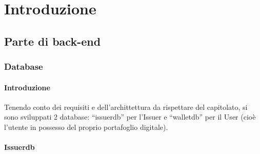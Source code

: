 \section{Introduzione}

\subsection{Parte di back-end}

\subsubsection{Database}\label{Database}

\paragraph{Introduzione}
Tenendo conto dei requisiti e dell’archittettura da rispettare del capitolato, si sono sviluppati 2 database: “issuerdb” per l’Issuer e “walletdb”  per il User (cioè l’utente in possesso del proprio portafoglio digitale).

\paragraph{Issuerdb}
    
